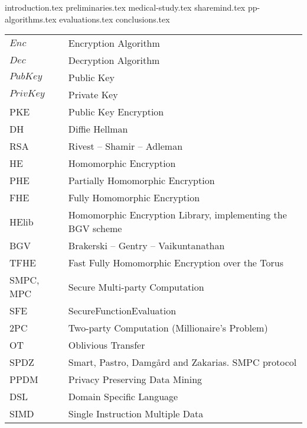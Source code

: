 \documentclass[inscr,ack]{dithesis}
\begin{document}
\frontmatter

\mainmatter


{introduction.tex}
{preliminaries.tex}
{medical-study.tex}
{sharemind.tex}
{pp-algorithms.tex}
{evaluations.tex}
{conclusions.tex}


\backmatter

\abbreviations
\begin{center}
	\renewcommand{\arraystretch}{1.5}
	\begin{longtable}{ l @{\qquad} l }
	\toprule
  $Enc$     & Encryption Algorithm \\
  $Dec$     & Decryption Algorithm \\
  $PubKey$  & Public Key \\
  $PrivKey$ & Private Key \\
  PKE       & Public Key Encryption \\
  DH        & Diffie Hellman \\
  RSA       & Rivest -- Shamir -- Adleman \\
  HE        & Homomorphic Encryption \\
  PHE       & Partially Homomorphic Encryption \\
  FHE       & Fully Homomorphic Encryption \\
  HElib     & Homomorphic Encryption Library, implementing the BGV scheme \\
  BGV       & Brakerski -- Gentry -- Vaikuntanathan \\
  TFHE      & Fast Fully Homomorphic Encryption over the Torus \\
  SMPC, MPC & Secure Multi-party Computation \\
  SFE       & SecureFunctionEvaluation \\
  2PC       & Two-party Computation (Millionaire's Problem) \\
  OT        & Oblivious Transfer \\
  SPDZ      & Smart, Pastro, Damg{\aa}rd and Zakarias. SMPC protocol \\
  PPDM      & Privacy Preserving Data Mining \\
  DSL       & Domain Specific Language \\
  SIMD      & Single Instruction Multiple Data \\

	\bottomrule
	\end{longtable}
\end{center}



\end{document}
